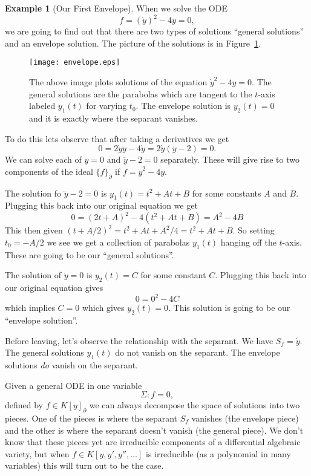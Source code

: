 \documentclass[12pt]{book}
\numberwithin{equation}{section}
\theoremstyle{definition}
\newtheorem{example}[theorem]{Example}
\theoremstyle{remark}
\begin{document}
\begin{example}[Our First Envelope]
	When we solve the ODE
	 $$ f=(\dot{y})^2 - 4y =0,$$
	we are going to find out that there are two types of solutions ``general solutions'' and an envelope solution. 
	The picture of the solutions is in Figure~\ref{F:envelope}.
	\begin{figure}[]
		\begin{center}
			\texttt{[image: envelope.eps]}
		\end{center}
	\caption{The above image plots solutions of the equation $\dot{y}^2-4y=0$.
		The general solutions are the parabolas which are tangent to the $t$-axis labeled $y_1(t)$ for varying $t_0$. 
		The envelope solution is $y_2(t)=0$ and it is exactly where the separant vanishes.	
}\label{F:envelope}
	\end{figure}
	 
	To do this lets observe that after taking a derivatives we get 
	$$0=2\dot{y}\ddot{y}-4\dot{y} = 2\dot{y}(\ddot{y}-2)=0.$$
	We can solve each of $\dot{y}=0$ and $\ddot{y}-2=0$ separately. 
	These will give rise to two components of the ideal $\lbrace f \rbrace_{\partial}$ if $f = \dot{y}^2-4y$. 
	
	The solution fo $\ddot{y}-2=0$ is $y_1(t) = t^2 + At + B$ for some constants $A$ and $B$.
	Plugging this back into our original equation we get 
	$$0=(2t+A)^2 -4(t^2+At+B)=A^2-4B$$
	This then given $(t+A/2)^2=t^2+At +A^2/4=t^2+At+B$.
	So setting $t_0=-A/2$ we see we get a collection of parabolas $y_1(t)$ hanging off the $t$-axis.
	These are going to be our ``general solutions''.
	
	The solution of $\dot{y}=0$ is $y_2(t)=C$ for some constant $C$. 
	Plugging this back into our original equation gives 
	$$ 0=0^2-4C$$
	which implies $C=0$ which gives $y_2(t)=0$. 
	This solution is going to be our ``envelope solution''.
	
	Before leaving, let's observe the relationship with the separant. 
	We have $S_f = \dot{y}$.
	The general solutions $y_1(t)$ do not vanish on the separant. 
	The envelope solutions \emph{do} vanish on the separant.
\end{example}

Given a general ODE in one variable
 $$ \Sigma \colon f=0, $$
defined by $f \in K[y]_{\partial}$ we can always decompose the space of solutions into two pieces. 
One of the pieces is where the separant $S_f$ vanishes (the envelope piece) and the other is where the separant doesn't vanish (the general piece). 
We don't know that these pieces yet are irreducible components of a differential algebraic variety, but when $f \in K[y,y',y'',\ldots]$ is irreducible (as a polynomial in many variables) this will turn out to be the case. 
\end{document}
